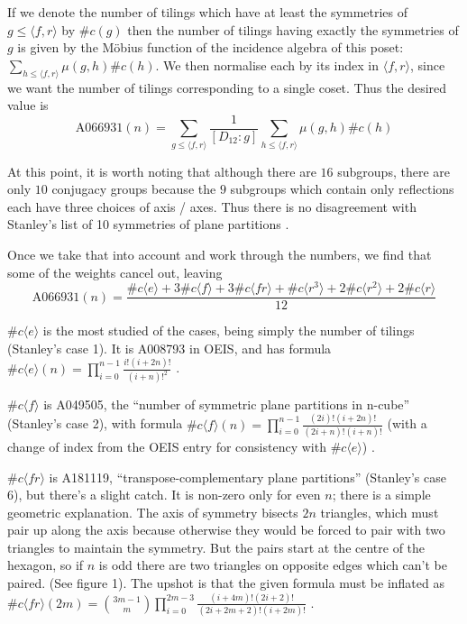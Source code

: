 \documentclass[11pt,a4paper]{article}
\theoremstyle{remark}
\begin{document}
If we denote the number of tilings which have at least the symmetries of $g \le \langle f, r\rangle$ by $\#c(g)$ then the number of tilings having exactly the symmetries of $g$ is given by the M\"obius function of the incidence algebra of this poset: $\sum_{h \le \langle f, r\rangle} \mu(g, h) \#c(h)$. We then normalise each by its index in $\langle f, r\rangle$, since we want the number of tilings corresponding to a single coset. Thus the desired value is $$\textrm{A066931}(n) = \sum_{g \le \langle f, r\rangle} \frac{1}{[D_{12} : g]} \sum_{h \le \langle f, r\rangle} \mu(g, h) \#c(h)$$

At this point, it is worth noting that although there are $16$ subgroups, there are only $10$ conjugacy groups because the $9$ subgroups which contain only reflections each have three choices of axis / axes. Thus there is no disagreement with Stanley's list of 10 symmetries of plane partitions \cite{Stanley86}.

Once we take that into account and work through the numbers, we find that some of the weights cancel out, leaving $$\textrm{A066931}(n) = \frac{\#c\langle e\rangle + 3\#c\langle f\rangle + 3\#c\langle fr\rangle +\#c\langle r^3\rangle + 2\#c\langle r^2\rangle + 2\#c\langle r\rangle}{12}$$

$\#c\langle e\rangle$ is the most studied of the cases, being simply the number of tilings (Stanley's case 1). It is A008793 in OEIS, and has formula $\#c\langle e\rangle(n) = \prod_{i=0}^{n-1} \frac{i!(i+2n)!}{(i+n)!^2}$ \cite{MacMahon16}.

$\#c\langle f\rangle$ is A049505, the ``number of symmetric plane partitions in n-cube'' (Stanley's case 2), with formula $\#c\langle f\rangle(n) = \prod_{i=0}^{n-1} \frac{(2i)!(i+2n)!}{(2i+n)!(i+n)!}$ (with a change of index from the OEIS entry for consistency with $\#c\langle e\rangle$) \cite{Andrews78}.

$\#c\langle fr\rangle$ is A181119, ``transpose-complementary plane partitions'' (Stanley's case 6), but there's a slight catch. It is non-zero only for even $n$; there is a simple geometric explanation. The axis of symmetry bisects $2n$ triangles, which must pair up along the axis because otherwise they would be forced to pair with two triangles to maintain the symmetry. But the pairs start at the centre of the hexagon, so if $n$ is odd there are two triangles on opposite edges which can't be paired. (See figure 1). The upshot is that the given formula must be inflated as $\#c\langle fr\rangle(2m) = \binom{3m-1}{m} \prod_{i=0}^{2m-3} \frac{(i+4m)!(2i+2)!}{(2i+2m+2)!(i+2m)!}$ \cite{Proctor88}.
\end{document}

